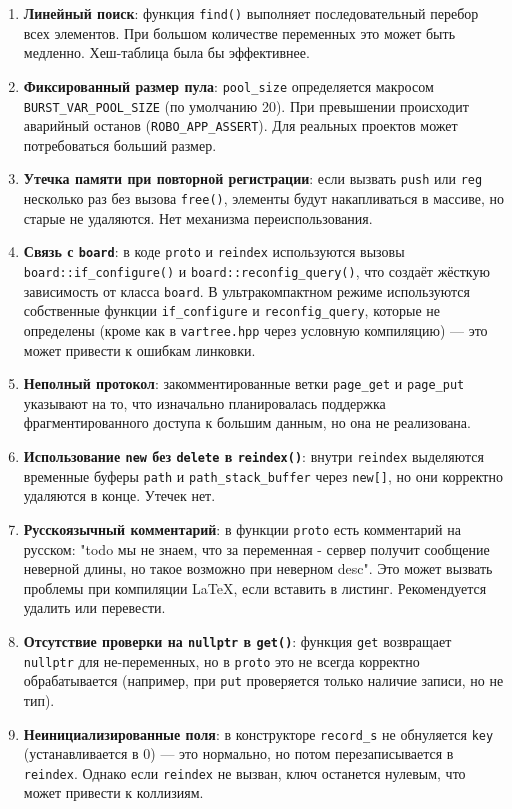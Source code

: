 \documentclass[a4paper,12pt]{article}
\begin{document}
\begin{enumerate}
    \item \textbf{Линейный поиск}: функция \texttt{find()} выполняет последовательный перебор всех элементов. При большом количестве переменных это может быть медленно. Хеш-таблица была бы эффективнее.
    \item \textbf{Фиксированный размер пула}: \texttt{pool\_size} определяется макросом \texttt{BURST\_VAR\_POOL\_SIZE} (по умолчанию 20). При превышении происходит аварийный останов (\texttt{ROBO\_APP\_ASSERT}). Для реальных проектов может потребоваться больший размер.
    \item \textbf{Утечка памяти при повторной регистрации}: если вызвать \texttt{push} или \texttt{reg} несколько раз без вызова \texttt{free()}, элементы будут накапливаться в массиве, но старые не удаляются. Нет механизма переиспользования.
    \item \textbf{Связь с \texttt{board}}: в коде \texttt{proto} и \texttt{reindex} используются вызовы \texttt{board::if\_configure()} и \texttt{board::reconfig\_query()}, что создаёт жёсткую зависимость от класса \texttt{board}. В ультракомпактном режиме используются собственные функции \texttt{if\_configure} и \texttt{reconfig\_query}, которые не определены (кроме как в \texttt{vartree.hpp} через условную компиляцию) — это может привести к ошибкам линковки.
    \item \textbf{Неполный протокол}: закомментированные ветки \texttt{page\_get} и \texttt{page\_put} указывают на то, что изначально планировалась поддержка фрагментированного доступа к большим данным, но она не реализована.
    \item \textbf{Использование \texttt{new} без \texttt{delete} в \texttt{reindex()}}: внутри \texttt{reindex} выделяются временные буферы \texttt{path} и \texttt{path\_stack\_buffer} через \texttt{new[]}, но они корректно удаляются в конце. Утечек нет.
    \item \textbf{Русскоязычный комментарий}: в функции \texttt{proto} есть комментарий на русском: "todo мы не знаем, что за переменная - сервер получит сообщение неверной длины, но такое возможно при неверном desc". Это может вызвать проблемы при компиляции LaTeX, если вставить в листинг. Рекомендуется удалить или перевести.
    \item \textbf{Отсутствие проверки на \texttt{nullptr} в \texttt{get()}}: функция \texttt{get} возвращает \texttt{nullptr} для не-переменных, но в \texttt{proto} это не всегда корректно обрабатывается (например, при \texttt{put} проверяется только наличие записи, но не тип).
    \item \textbf{Неинициализированные поля}: в конструкторе \texttt{record\_s} не обнуляется \texttt{key} (устанавливается в 0) — это нормально, но потом перезаписывается в \texttt{reindex}. Однако если \texttt{reindex} не вызван, ключ останется нулевым, что может привести к коллизиям.
\end{enumerate}
\end{document}

